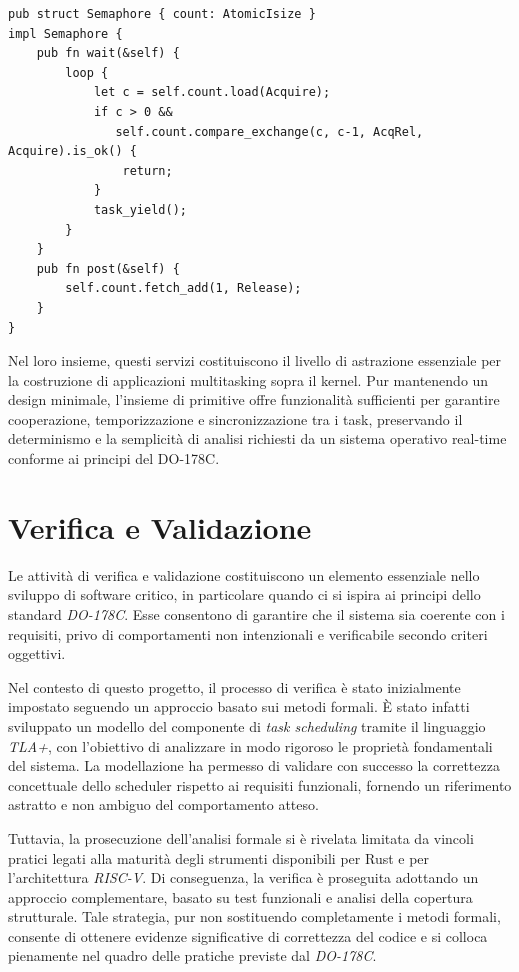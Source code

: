 \documentclass[italian, Lau, oneside]{sapthesis} %
\begin{document}
\begin{center}
\begin{verbatim}
pub struct Semaphore { count: AtomicIsize }
impl Semaphore {
    pub fn wait(&self) {
        loop {
            let c = self.count.load(Acquire);
            if c > 0 &&
               self.count.compare_exchange(c, c-1, AcqRel, Acquire).is_ok() {
                return;
            }
            task_yield();
        }
    }
    pub fn post(&self) {
        self.count.fetch_add(1, Release);
    }
}
\end{verbatim}
\end{center}

Nel loro insieme, questi servizi costituiscono il livello di astrazione essenziale per la costruzione di applicazioni multitasking sopra il kernel.  
Pur mantenendo un design minimale, l’insieme di primitive offre funzionalità sufficienti per garantire cooperazione, temporizzazione e sincronizzazione tra i task, preservando il determinismo e la semplicità di analisi richiesti da un sistema operativo real-time conforme ai principi del DO-178C.

\chapter*{Verifica e Validazione}
\label{cap:4}

Le attività di verifica e validazione costituiscono un elemento essenziale nello sviluppo di software critico, in particolare quando ci si ispira ai principi dello standard \textit{DO-178C}. Esse consentono di garantire che il sistema sia coerente con i requisiti, privo di comportamenti non intenzionali e verificabile secondo criteri oggettivi.

Nel contesto di questo progetto, il processo di verifica è stato inizialmente impostato seguendo un approccio basato sui metodi formali. È stato infatti sviluppato un modello del componente di \textit{task scheduling} tramite il linguaggio \textit{TLA+}, con l’obiettivo di analizzare in modo rigoroso le proprietà fondamentali del sistema. La modellazione ha permesso di validare con successo la correttezza concettuale dello scheduler rispetto ai requisiti funzionali, fornendo un riferimento astratto e non ambiguo del comportamento atteso.

Tuttavia, la prosecuzione dell’analisi formale si è rivelata limitata da vincoli pratici legati alla maturità degli strumenti disponibili per Rust e per l’architettura \textit{RISC-V}. Di conseguenza, la verifica è proseguita adottando un approccio complementare, basato su test funzionali e analisi della copertura strutturale. Tale strategia, pur non sostituendo completamente i metodi formali, consente di ottenere evidenze significative di correttezza del codice e si colloca pienamente nel quadro delle pratiche previste dal \textit{DO-178C}.
\end{document}
